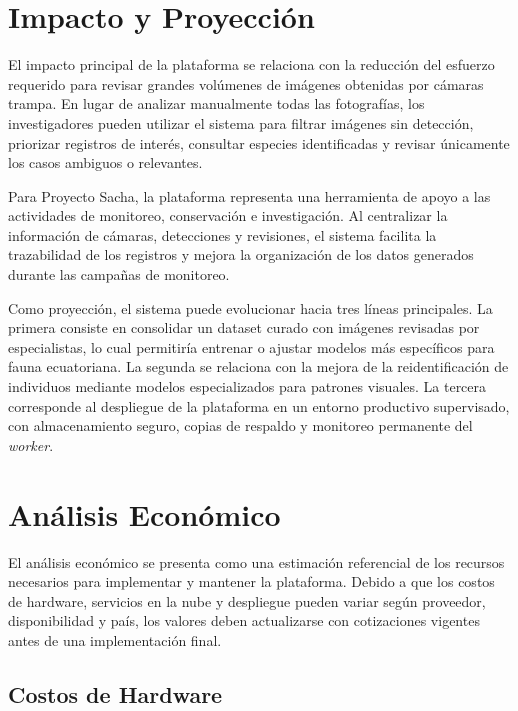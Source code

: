 \section{Impacto y Proyección}
\label{sec:impacto_proyeccion}

El impacto principal de la plataforma se relaciona con la reducción del esfuerzo requerido para revisar grandes volúmenes de imágenes obtenidas por cámaras trampa. En lugar de analizar manualmente todas las fotografías, los investigadores pueden utilizar el sistema para filtrar imágenes sin detección, priorizar registros de interés, consultar especies identificadas y revisar únicamente los casos ambiguos o relevantes.

Para Proyecto Sacha, la plataforma representa una herramienta de apoyo a las actividades de monitoreo, conservación e investigación. Al centralizar la información de cámaras, detecciones y revisiones, el sistema facilita la trazabilidad de los registros y mejora la organización de los datos generados durante las campañas de monitoreo.

Como proyección, el sistema puede evolucionar hacia tres líneas principales. La primera consiste en consolidar un dataset curado con imágenes revisadas por especialistas, lo cual permitiría entrenar o ajustar modelos más específicos para fauna ecuatoriana. La segunda se relaciona con la mejora de la reidentificación de individuos mediante modelos especializados para patrones visuales. La tercera corresponde al despliegue de la plataforma en un entorno productivo supervisado, con almacenamiento seguro, copias de respaldo y monitoreo permanente del \textit{worker}.

\section{Análisis Económico}
\label{sec:analisis_economico}

El análisis económico se presenta como una estimación referencial de los recursos necesarios para implementar y mantener la plataforma. Debido a que los costos de hardware, servicios en la nube y despliegue pueden variar según proveedor, disponibilidad y país, los valores deben actualizarse con cotizaciones vigentes antes de una implementación final.

\subsection{Costos de Hardware}
\label{subsec:costos_hardware}

